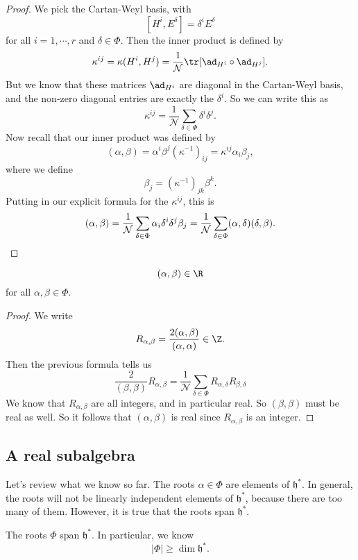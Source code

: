 \documentclass[a4paper]{article}
\begin{document}
\begin{proof}
  We pick the Cartan-Weyl basis, with
  \[
    [H^i, E^\delta] = \delta^i E^\delta
  \]
  for all $i = 1, \cdots, r$ and $\delta \in \Phi$. Then the inner product is defined by
  \[
    \kappa^{ij} = \kappa(H^i, H^j) = \frac{1}{\mathcal{N}} \tr [\ad_{H^i} \circ \ad_{H^j}].
  \]
  But we know that these matrices $\ad_{H^i}$ are diagonal in the Cartan-Weyl basis, and the non-zero diagonal entries are exactly the $\delta^i$. So we can write this as
  \[
    \kappa^{ij} = \frac{1}{\mathcal{N}} \sum_{\delta \in \Phi} \delta^i \delta^j.
  \]
  Now recall that our inner product was defined by
  \[
    (\alpha, \beta) = \alpha^i \beta^j (\kappa^{-1})_{ij} = \kappa^{ij} \alpha_i \beta_j,
  \]
  where we define
  \[
    \beta_j = (\kappa^{-1})_{jk} \beta^k.
  \]
  Putting in our explicit formula for the $\kappa^{ij}$, this is
  \[
    (\alpha, \beta) = \frac{1}{\mathcal{N}}\sum_{\delta \in \Phi} \alpha_i \delta^i \delta^j \beta_j = \frac{1}{\mathcal{N}}\sum_{\delta \in \Phi}(\alpha, \delta) (\delta, \beta). \qedhere
  \]
\end{proof}

\begin{cor}
  \[
    (\alpha, \beta) \in \R
  \]
  for all $\alpha, \beta \in \Phi$.
\end{cor}

\begin{proof}
  We write
  \[
    R_{\alpha, \beta} = \frac{2(\alpha, \beta)}{(\alpha, \alpha)} \in \Z.
  \]
  Then the previous formula tells us
  \[
    \frac{2}{(\beta, \beta)} R_{\alpha, \beta} = \frac{1}{\mathcal{N}} \sum_{\delta \in \Phi} R_{\alpha, \delta} R_{\beta, \delta}
  \]
  We know that $R_{\alpha, \beta}$ are all integers, and in particular real. So $(\beta, \beta)$ must be real as well. So it follows that $(\alpha, \beta)$ is real since $R_{\alpha, \beta}$ is an integer.
\end{proof}

\subsection{A real subalgebra}
Let's review what we know so far. The roots $\alpha \in \Phi$ are elements of $\mathfrak{h}^*$. In general, the roots will not be linearly independent elements of $\mathfrak{h}^*$, because there are too many of them. However, it is true that the roots span $\mathfrak{h}^*$.

\begin{prop}
  The roots $\Phi$ span $\mathfrak{h}^*$. In particular, we know
  \[
    |\Phi| \geq \dim \mathfrak{h}^*.
  \]
\end{prop}
\end{document}

